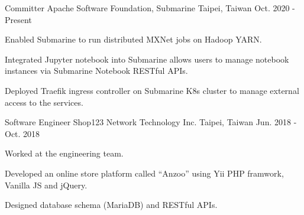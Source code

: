 \begin{cventries}
  \cventry
    {Committer} %
    {Apache Software Foundation, Submarine} %
    {Taipei, Taiwan} %
    {Oct. 2020 - Present} %
    {
      \begin{cvitems} %
        \item {Enabled Submarine to run distributed MXNet jobs on Hadoop YARN.}
        \item {Integrated Jupyter notebook into Submarine allows users to manage notebook instances via Submarine Notebook RESTful APIs.}
        \item {Deployed Traefik ingress controller on Submarine K8s cluster to manage external access to the services.}
      \end{cvitems}
    }

  \cventry
    {Software Engineer} %
    {Shop123 Network Technology Inc.} %
    {Taipei, Taiwan} %
    {Jun. 2018 - Oct. 2018} %
    {
      \begin{cvitems} %
        \item {Worked at the engineering team.}
        \item {Developed an online store platform called “Anzoo” using Yii PHP framwork, Vanilla JS and jQuery.}
        \item {Designed database schema (MariaDB) and RESTful APIs.}
      \end{cvitems}
    }


\end{cventries}
